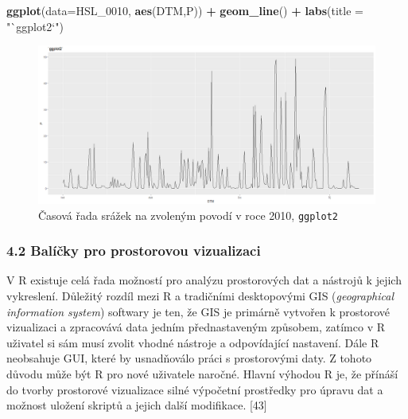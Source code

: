 \documentclass[12pt,]{article}
\newenvironment{Shaded}{\begin{snugshade}}{\end{snugshade}}
\newcommand{\KeywordTok}[1]{\textcolor[rgb]{0.13,0.29,0.53}{\textbf{#1}}}
\newcommand{\DataTypeTok}[1]{\textcolor[rgb]{0.13,0.29,0.53}{#1}}
\newcommand{\DecValTok}[1]{\textcolor[rgb]{0.00,0.00,0.81}{#1}}
\newcommand{\StringTok}[1]{\textcolor[rgb]{0.31,0.60,0.02}{#1}}
\newcommand{\OperatorTok}[1]{\textcolor[rgb]{0.81,0.36,0.00}{\textbf{#1}}}
\newcommand{\NormalTok}[1]{#1}
\begin{document}
\begin{Shaded}
\begin{Highlighting}[]
\KeywordTok{ggplot}\NormalTok{(}\DataTypeTok{data=}\NormalTok{HSL_}\DecValTok{0010}\NormalTok{, }\KeywordTok{aes}\NormalTok{(DTM,P)) }\OperatorTok{+}\StringTok{ }
\StringTok{  }\KeywordTok{geom_line}\NormalTok{() }\OperatorTok{+}\StringTok{ }
\StringTok{  }\KeywordTok{labs}\NormalTok{(}\DataTypeTok{title =} \StringTok{"`ggplot2`"}\NormalTok{)}
\end{Highlighting}
\end{Shaded}

\begin{figure}[H]
      \includegraphics[width=\textwidth]{fig/3ggplot}
      \caption{Časová řada srážek na zvoleným povodí v roce 2010, \texttt{ggplot2}}
      \label{fig1c}
\end{figure}

\newpage

\subsubsection{4.2 Balíčky pro prostorovou
vizualizaci}\label{balicky-pro-prostorovou-vizualizaci}

\qquad V R existuje celá řada možností pro analýzu prostorových dat a
nástrojů k jejich vykreslení. Důležitý rozdíl mezi R a tradičními
desktopovými GIS (\emph{geographical information system}) softwary je
ten, že GIS je primárně vytvořen k prostorové vizualizaci a zpracovává
data jedním přednastaveným způsobem, zatímco v R uživatel si sám musí
zvolit vhodné nástroje a odpovídající nastavení. Dále R neobsahuje GUI,
které by usnadňoválo práci s prostorovými daty. Z tohoto důvodu může být
R pro nové uživatele naročné. Hlavní výhodou R je, že přínáší do tvorby
prostorové vizualizace silné výpočetní prostředky pro úpravu dat a
možnost uložení skriptů a jejich další modifikace. {[}43{]}
\end{document}
